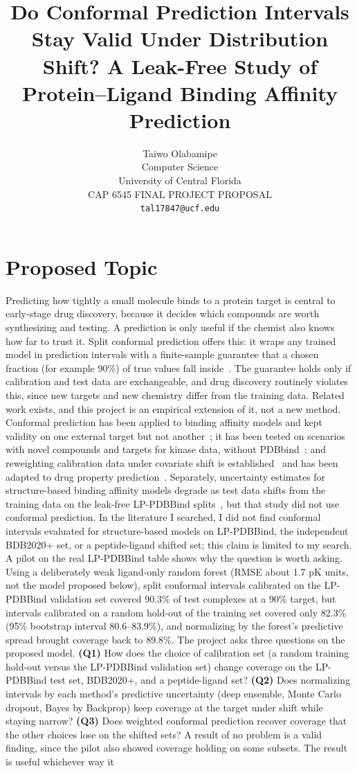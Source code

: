 \documentclass[10pt,twocolumn]{article}
\title{\textbf{Do Conformal Prediction Intervals Stay Valid Under Distribution Shift? A Leak-Free Study of Protein--Ligand Binding Affinity Prediction}}
\author{
  Taiwo Olabamipe \\
  Computer Science \\
  University of Central Florida \\
  CAP 6545 FINAL PROJECT PROPOSAL \\
  \texttt{tal17847@ucf.edu}
}
\date{}
\begin{document}
\maketitle


\section{Proposed Topic}

Predicting how tightly a small molecule binds to a protein target is central to early-stage drug discovery, because it decides which compounds are worth synthesizing and testing. A prediction is only useful if the chemist also knows how far to trust it. Split conformal prediction offers this: it wraps any trained model in prediction intervals with a finite-sample guarantee that a chosen fraction (for example 90\%) of true values fall inside~\cite{angelopoulos2023}. The guarantee holds only if calibration and test data are exchangeable, and drug discovery routinely violates this, since new targets and new chemistry differ from the training data. Related work exists, and this project is an empirical extension of it, not a new method. Conformal prediction has been applied to binding affinity models and kept validity on one external target but not another~\cite{parks2020}; it has been tested on scenarios with novel compounds and targets for kinase data, without PDBbind~\cite{orsolic2023}; and reweighting calibration data under covariate shift is established~\cite{tibshirani2019} and has been adapted to drug property prediction~\cite{codrug2023}. Separately, uncertainty estimates for structure-based binding affinity models degrade as test data shifts from the training data on the leak-free LP-PDBBind splits~\cite{rayka2025,lppdbbind}, but that study did not use conformal prediction. In the literature I searched, I did not find conformal intervals evaluated for structure-based models on LP-PDBBind, the independent BDB2020+ set, or a peptide-ligand shifted set; this claim is limited to my search. A pilot on the real LP-PDBBind table shows why the question is worth asking. Using a deliberately weak ligand-only random forest (RMSE about 1.7 pK units, not the model proposed below), split conformal intervals calibrated on the LP-PDBBind validation set covered 90.3\% of test complexes at a 90\% target, but intervals calibrated on a random hold-out of the training set covered only 82.3\% (95\% bootstrap interval 80.6--83.9\%), and normalizing by the forest's predictive spread brought coverage back to 89.8\%. The project asks three questions on the proposed model. \textbf{(Q1)} How does the choice of calibration set (a random training hold-out versus the LP-PDBBind validation set) change coverage on the LP-PDBBind test set, BDB2020+, and a peptide-ligand set? \textbf{(Q2)} Does normalizing intervals by each method's predictive uncertainty (deep ensemble, Monte Carlo dropout, Bayes by Backprop) keep coverage at the target under shift while staying narrow? \textbf{(Q3)} Does weighted conformal prediction recover coverage that the other choices lose on the shifted sets? A result of no problem is a valid finding, since the pilot also showed coverage holding on some subsets. The result is useful whichever way it 
\end{document}
